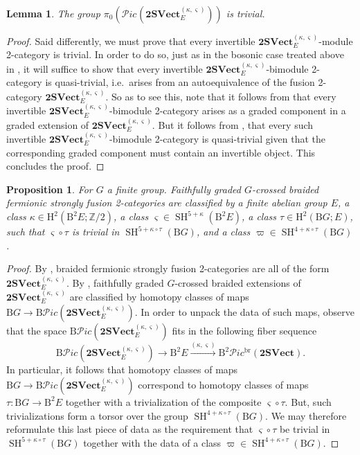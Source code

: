 \documentclass[11pt,reqno]{amsart}
\DeclareMathOperator{\br}{br}
\newcommand{\Z}{\mathbb{Z}}
\DeclareMathOperator{\SH}{SH}
\newcommand{\tSVect}{\mathbf{2SVect}}
\newcommand{\sPic}{\mathscr{P}ic}
\newcommand{\rH}{\mathrm{H}}
\newcommand{\rB}{\mathrm{B}}
\numberwithin{equation}{section}
\theoremstyle{plain}
\newtheorem{lem}[equation]{Lemma}
\newtheorem{prop}[equation]{Proposition}
\theoremstyle{definition}
\begin{document}
\begin{lem}\label{lem:PicBFSF2C}
The group $\pi_0(\sPic^{}(\tSVect^{(\kappa,\varsigma)}_{E}))$ is trivial.
\end{lem}
\begin{proof}
Said differently, we must prove that every invertible $\tSVect^{(\kappa,\varsigma)}_{E}$-module 2-category is trivial. In order to do so, just as in the bosonic case treated above in , it will suffice to show that every invertible $\tSVect^{(\kappa,\varsigma)}_{E}$-bimodule 2-category is quasi-trivial, i.e.\ arises from an autoequivalence of the fusion 2-category $\tSVect^{(\kappa,\varsigma)}_{E}$. 
So as to see this, note that it follows from \cite[Lemma 4.2.3]{D9} that every invertible $\tSVect^{(\kappa,\varsigma)}_{E}$-bimodule 2-category arises as a graded component in a graded extension of $\tSVect^{(\kappa,\varsigma)}_{E}$. But it follows from \cite{JFY}, that every such invertible $\tSVect^{(\kappa,\varsigma)}_{E}$-bimodule 2-category is quasi-trivial given that the corresponding graded component must contain an invertible object. This concludes the proof. 
\end{proof}

\begin{prop}\label{thm:EF}
   For $G$ a finite group. Faithfully graded $G$-crossed braided fermionic strongly fusion 2-categories are classified by a finite abelian group $E$, a class $\kappa \in \rH^2(\rB^2 E;\Z/2)$, a class $\varsigma \in \SH^{5+\kappa}(\rB^2 E)$, a class $\tau\in \rH^2(\rB G;E)$, such that $\varsigma \circ \tau$ is trivial in $\SH^{5+\kappa\circ\tau}(\rB G)$, and a class $\varpi \in \SH^{4+\kappa\circ\tau}(\rB G)$.
\end{prop}

\begin{proof}
By , braided fermionic strongly fusion 2-categories are all of the form $\tSVect^{(\kappa,\varsigma)}_{E}$.
By , faithfully graded $G$-crossed braided extensions of $\tSVect^{(\kappa,\varsigma)}_{E}$ are classified by homotopy classes of maps $\mathrm{B}G\rightarrow \rB \sPic(\tSVect^{(\kappa,\varsigma)}_{E})$. In order to unpack the data of such maps, observe that the space $\rB\sPic(\tSVect^{(\kappa,\varsigma)}_{E})$ fits in the following fiber sequence
\begin{equation}\label{eq:pic2svectpullback}
\rB\sPic(\tSVect^{(\kappa,\varsigma)}_{E})\rightarrow\mathrm{B}^2E\xrightarrow{(\kappa,\varsigma)}\rB^2\sPic^{\br}(\tSVect).
\end{equation}
In particular, it follows that homotopy classes of maps $\rB G\rightarrow \rB\sPic(\tSVect^{(\kappa,\varsigma)}_{E})$ correspond to homotopy classes of maps $\tau: \rB G \rightarrow \rB^2 E$ together with a trivialization of the composite $\varsigma \circ \tau$. But, such trivializations form a torsor over the group $\SH^{4+\kappa\circ\tau}(\rB G)$. We may therefore reformulate this last piece of data as the requirement that $\varsigma \circ \tau$ be trivial in $\SH^{5+\kappa\circ\tau}(\rB G)$ together with the data of a class $\varpi \in \SH^{4+\kappa\circ\tau}(\rB G)$.
\end{proof}
\end{document}
